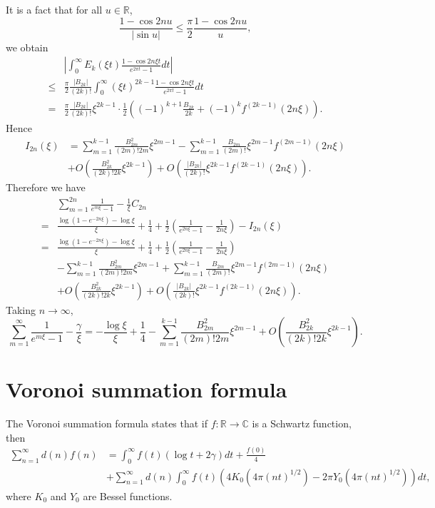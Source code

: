 \documentclass{article}
\begin{document}
It is a fact that for all $u \in \mathbb{R}$,
\[
\frac{1-\cos 2n u}{|\sin u|} \leq \frac{\pi}{2} \frac{1-\cos 2n u}{u},
\]
we obtain
\[
\begin{split}
&\left| \int_0^\infty E_k(\xi t)  \frac{1-\cos 2n\xi t}{e^{2\pi t}-1} dt\right|\\
\leq& \frac{\pi}{2} \frac{|B_{2k}|}{(2k)!} \int_0^\infty (\xi t)^{2k-1} \frac{1-\cos 2n\xi t}{e^{2\pi t}-1} dt\\
=& \frac{\pi}{2} \frac{|B_{2k}|}{(2k)!} \xi^{2k-1} \cdot \frac{1}{2}
\left(
(-1)^{k+1} \frac{B_{2k}}{2k}+(-1)^{k} f^{(2k-1)}(2n\xi)
\right).
\end{split}
\]
Hence
\begin{align*}
I_{2n}(\xi)&=\sum_{m=1}^{k-1} \frac{B_{2m}^2}{(2m)! 2m} \xi^{2m-1}
 -\sum_{m=1}^{k-1} \frac{B_{2m}}{(2m)!} \xi^{2m-1} f^{(2m-1)}(2n\xi)\\
 &+O\left( \frac{B_{2k}^2}{(2k)!2k} \xi^{2k-1}\right)
 +O\left( \frac{|B_{2k}|}{(2k)!} \xi^{2k-1} f^{(2k-1)}(2n\xi) \right).
\end{align*}
Therefore we have
\[
\begin{split}
&\sum_{m=1}^{2n} \frac{1}{e^{m\xi}-1} - \frac{1}{\xi} C_{2n}\\
=&\frac{\log(1-e^{-2n \xi})-\log \xi}{\xi}
+\frac{1}{4}+\frac{1}{2}\left( \frac{1}{e^{2n \xi}-1}-\frac{1}{2n\xi}\right)-I_{2n}(\xi)\\
=&\frac{\log(1-e^{-2n \xi})-\log \xi}{\xi}+\frac{1}{4}+\frac{1}{2}\left( \frac{1}{e^{2n \xi}-1}-\frac{1}{2n\xi}\right)\\
&-\sum_{m=1}^{k-1} \frac{B_{2m}^2}{(2m)! 2m} \xi^{2m-1}
+\sum_{m=1}^{k-1} \frac{B_{2m}}{(2m)!} \xi^{2m-1} f^{(2m-1)}(2n\xi)\\
&+O\left( \frac{B_{2k}^2}{(2k)!2k} \xi^{2k-1}\right)
 +O\left( \frac{|B_{2k}|}{(2k)!} \xi^{2k-1} f^{(2k-1)}(2n\xi) \right).
\end{split}
\]
Taking $n \to \infty$,
\[
\sum_{m=1}^\infty \frac{1}{e^{m\xi}-1} - \frac{\gamma}{\xi}=-\frac{\log \xi}{\xi}
+\frac{1}{4}-\sum_{m=1}^{k-1} \frac{B_{2m}^2}{(2m)! 2m} \xi^{2m-1}+O\left( \frac{B_{2k}^2}{(2k)!2k} \xi^{2k-1}\right).
\]






\section{Voronoi summation formula}
The Voronoi summation formula  \cite[p.~182]{cohen} states that if $f:\mathbb{R} \to \mathbb{C}$
is a Schwartz function, then
\begin{align*}
\sum_{n=1}^\infty d(n) f(n)&=\int_0^\infty f(t)(\log t + 2\gamma) dt + \frac{f(0)}{4}\\
&+\sum_{n=1}^\infty d(n) \int_0^\infty f(t)(4K_0(4\pi(nt)^{1/2})-2\pi Y_0(4\pi(nt)^{1/2})) dt,
\end{align*}
where $K_0$ and $Y_0$ are Bessel functions. 
\end{document}
